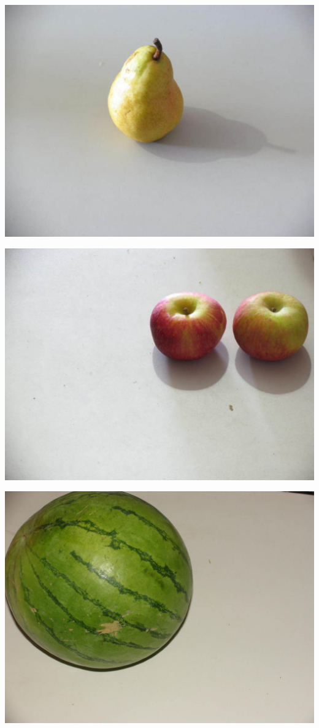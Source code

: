 \documentclass{article}
\begin{document}
\begin{multicols}{2}
\centering
{}
\includegraphics[scale=0.3]{../data/spanish_pear_001.jpg}

\centering
{}
\includegraphics[scale=0.3]{../data/fuji_apple_001.jpg}

\centering
{}
\includegraphics[scale=0.3]{../data/watermelon_001.jpg}


\end{multicols}
\end{document}
